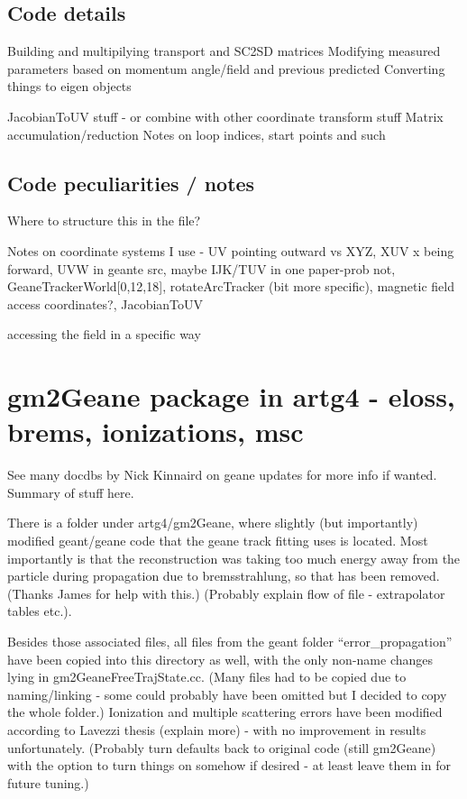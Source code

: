 \documentclass{article}
\begin{document}
\subsection{Code details}

Building and multipilying transport and SC2SD matrices
Modifying measured parameters based on momentum angle/field and previous predicted
Converting things to eigen objects

JacobianToUV stuff - or combine with other coordinate transform stuff
Matrix accumulation/reduction
Notes on loop indices, start points and such

\subsection{Code peculiarities / notes}

Where to structure this in the file?

Notes on coordinate systems I use - UV pointing outward vs XYZ, XUV x being forward, UVW in geante src, maybe IJK/TUV in one paper-prob not, GeaneTrackerWorld[0,12,18], rotateArcTracker (bit more specific), magnetic field access coordinates?, JacobianToUV

accessing the field in a specific way



\section{gm2Geane package in artg4 - eloss, brems, ionizations, msc}

See many docdbs by Nick Kinnaird on geane updates for more info if wanted. Summary of stuff here.


There is a folder under artg4/gm2Geane, where slightly (but importantly) modified geant/geane code that the geane track fitting uses is located. Most importantly is that the reconstruction was taking too much energy away from the particle during propagation due to bremsstrahlung, so that has been removed. (Thanks James for help with this.) (Probably explain flow of file - extrapolator tables etc.).

Besides those associated files, all files from the geant folder ``error\_propagation'' have been copied into this directory as well, with the only non-name changes lying in gm2GeaneFreeTrajState.cc. (Many files had to be copied due to naming/linking - some could probably have been omitted but I decided to copy the whole folder.) Ionization and multiple scattering errors have been modified according to Lavezzi thesis (explain more) - with no improvement in results unfortunately. (Probably turn defaults back to original code (still gm2Geane) with the option to turn things on somehow if desired - at least leave them in for future tuning.)
\end{document}
